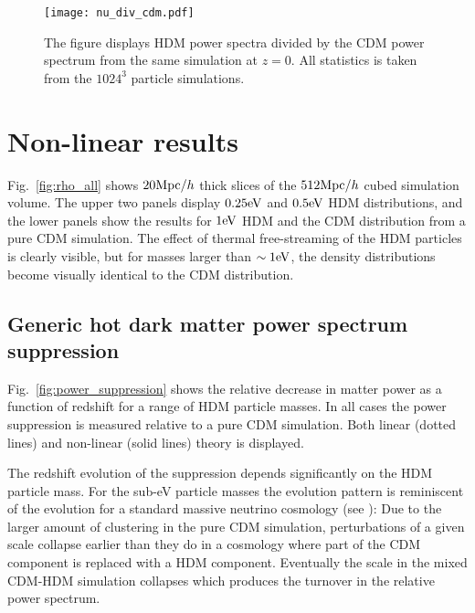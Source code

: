 \documentclass[11pt,a4paper]{article}
\renewcommand\({\left(}
\renewcommand\){\right)}
\renewcommand\[{\left[}
\renewcommand\]{\right]}
\begin{document}
 \begin{figure}[t]
  \vspace*{-3.0cm}
\begin{center}
\hspace*{-0.6cm}
\texttt{[image: nu\_div\_cdm.pdf]}
\end{center}
 \vspace*{-2.6cm}
\caption{The figure displays HDM power spectra divided by the CDM power spectrum from the same simulation at $z=0$. All statistics is taken from the $1024^3$ particle simulations.}
   \label{fig:power_nu_div_cdm}
\end{figure}
\section{Non-linear results}\label{sec:results}
Fig.~\ref{fig:rho_all} shows $20 {\rm Mpc} / h$ thick slices of the $512 {\rm Mpc} / h$ cubed simulation volume. The upper two panels display $0.25{\rm eV}$ and $0.5 {\rm eV}$ HDM distributions, and the lower panels show the results for $1{\rm eV}$ HDM and the CDM distribution from a pure CDM simulation. The effect of thermal free-streaming of the HDM particles is clearly visible, but for masses larger than $\sim 1{\rm eV}$, the density distributions become visually identical to the CDM distribution.  

\subsection{Generic hot dark matter power spectrum suppression}
Fig.~\ref{fig:power_suppression} shows the relative decrease in matter power as a function of redshift for a range of HDM particle masses. In all cases the power suppression is measured relative to a pure CDM simulation. Both linear (dotted lines) and non-linear (solid lines) theory is displayed.

The redshift evolution of the suppression depends significantly on the HDM particle mass. For the sub-eV particle masses the evolution pattern is reminiscent of the evolution for a standard massive neutrino cosmology (see \cite{Brandbyge:2008rv}): Due to the larger amount of clustering in the pure CDM simulation, perturbations of a given scale collapse earlier than they do in a cosmology where part of the CDM component is replaced with a HDM component. Eventually the scale in the mixed CDM-HDM simulation collapses which produces the turnover in the relative power spectrum.
\end{document}
